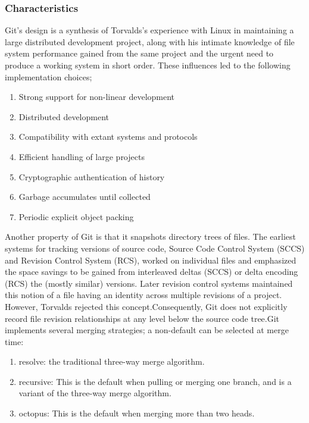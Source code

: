 \documentclass[a4paper,12pt]{article}
\begin{document}
\subsubsection{Characteristics}\vspace{2mm}
Git's design is a synthesis of Torvalds's experience with Linux in maintaining a large distributed development project, along with his intimate knowledge of file system performance gained from the same project and the urgent need to produce a working system in short order. These influences led to the following implementation choices;
\begin{enumerate}
\item Strong support for non-linear development
\item Distributed development
\item Compatibility with extant systems and protocols
\item  Efficient handling of large projects
\item Cryptographic authentication of history
\item Garbage accumulates until collected
\item Periodic explicit object packing
\end{enumerate}\par
Another property of Git is that it snapshots directory trees of files. The earliest systems for tracking versions of source code, Source Code Control System (SCCS) and Revision Control System (RCS), worked on individual files and emphasized the space savings to be gained from interleaved deltas (SCCS) or delta encoding (RCS) the (mostly similar) versions. Later revision control systems maintained this notion of a file having an identity across multiple revisions of a project. However, Torvalds rejected this concept.Consequently, Git does not explicitly record file revision relationships at any level below the source code tree.Git implements several merging strategies; a non-default can be selected at merge time:
\begin{enumerate}
\item { resolve:} the traditional three-way merge algorithm.
\item {recursive:} This is the default when pulling or merging one branch, and is a variant of the three-way merge algorithm.
\item {octopus:} This is the default when merging more than two heads.
\end{enumerate}\par\vspace{2mm}
\end{document}
